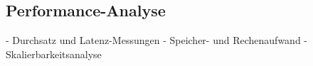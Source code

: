 \subsection{Performance-Analyse} \label{sec:Performance-Analyse}

- Durchsatz und Latenz-Messungen
- Speicher- und Rechenaufwand
- Skalierbarkeitsanalyse